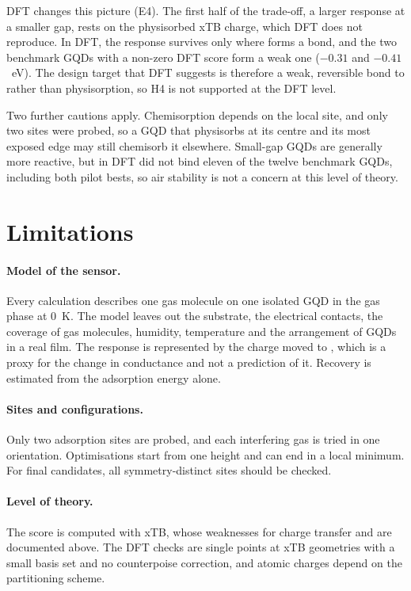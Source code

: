 DFT changes this picture (E4). The first half of the trade-off, a larger response at a smaller gap,
rests on the physisorbed xTB charge, which DFT does not reproduce. In DFT, the response survives
only where  forms a bond, and the two benchmark GQDs with a non-zero DFT score form a weak
one (\(-0.31\) and \(-0.41\)~eV). The design target that DFT suggests is therefore a weak,
reversible bond to  rather than physisorption, so H4 is not supported at the DFT level.

Two further cautions apply. Chemisorption depends on the local site, and only two sites were
probed, so a GQD that physisorbs  at its centre and its most exposed edge may still
chemisorb it elsewhere. Small-gap GQDs are generally more reactive, but in DFT  did not bind
eleven of the twelve benchmark GQDs, including both pilot bests, so air stability is not a concern
at this level of theory.

\section{Limitations}
\label{sec:limitations}

\paragraph{Model of the sensor.} Every calculation describes one gas molecule on one isolated GQD
in the gas phase at 0~K. The model leaves out the substrate, the electrical contacts, the
coverage of gas molecules, humidity, temperature and the arrangement of GQDs in a real film. The
response is represented by the charge moved to , which is a proxy for the change in
conductance and not a prediction of it. Recovery is estimated from the adsorption energy alone.

\paragraph{Sites and configurations.} Only two adsorption sites are probed, and each interfering
gas is tried in one orientation. Optimisations start from one height and can end in a local
minimum. For final candidates, all symmetry-distinct sites should be checked.

\paragraph{Level of theory.} The score is computed with xTB, whose weaknesses for charge transfer
and  are documented above. The DFT checks are single points at xTB geometries with a small
basis set and no counterpoise correction, and atomic charges depend on the partitioning scheme.

